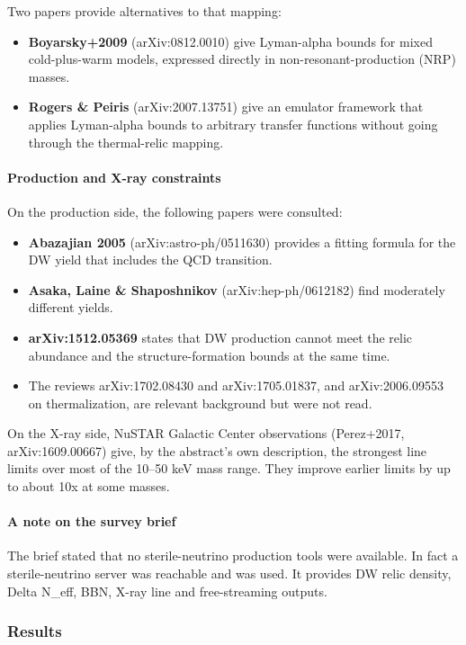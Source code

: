 \documentclass[11pt,a4paper]{article}
\begin{document}
Two papers provide alternatives to that mapping:

\begin{itemize}
  \item \textbf{Boyarsky+2009} (arXiv:0812.0010) give Lyman-alpha bounds for mixed cold-plus-warm models, expressed directly in non-resonant-production (NRP) masses.
  \item \textbf{Rogers \& Peiris} (arXiv:2007.13751) give an emulator framework that applies Lyman-alpha bounds to arbitrary transfer functions without going through the thermal-relic mapping.
\end{itemize}
\paragraph{Production and X-ray constraints}
On the production side, the following papers were consulted:

\begin{itemize}
  \item \textbf{Abazajian 2005} (arXiv:astro-ph/0511630) provides a fitting formula for the DW yield that includes the QCD transition.
  \item \textbf{Asaka, Laine \& Shaposhnikov} (arXiv:hep-ph/0612182) find moderately different yields.
  \item \textbf{arXiv:1512.05369} states that DW production cannot meet the relic abundance and the structure-formation bounds at the same time.
  \item The reviews arXiv:1702.08430 and arXiv:1705.01837, and arXiv:2006.09553 on thermalization, are relevant background but were not read.
\end{itemize}
On the X-ray side, NuSTAR Galactic Center observations (Perez+2017, arXiv:1609.00667) give, by the abstract's own description, the strongest line limits over most of the 10--50 keV mass range. They improve earlier limits by up to about 10x at some masses.

\paragraph{A note on the survey brief}
The brief stated that no sterile-neutrino production tools were available. In fact a sterile-neutrino server was reachable and was used. It provides DW relic density, Delta N\_eff, BBN, X-ray line and free-streaming outputs.

\subsubsection*{Results}
\end{document}
